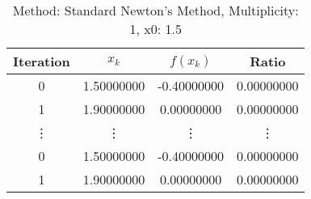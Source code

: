 \begin{table}
\centering
\caption{Method: Standard Newton's Method, Multiplicity: 1, x0: 1.5}
\label{tab:table_Standard_Newton's_Method_1_1_5}
\begin{tabular}{c c c c}
\toprule
Iteration &      $x_k$ &    $f(x_k)$ &      Ratio \\
\midrule
        0 & 1.50000000 & -0.40000000 & 0.00000000 \\
        1 & 1.90000000 &  0.00000000 & 0.00000000 \\
   \vdots &     \vdots &      \vdots &     \vdots \\
        0 & 1.50000000 & -0.40000000 & 0.00000000 \\
        1 & 1.90000000 &  0.00000000 & 0.00000000 \\
\bottomrule
\end{tabular}
\end{table}
